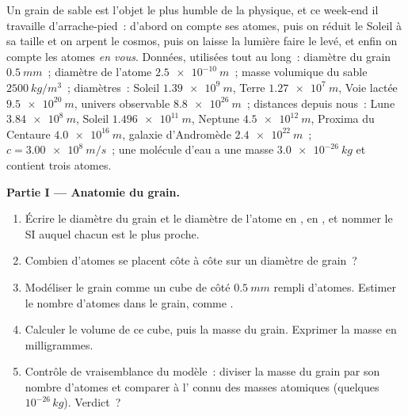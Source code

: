 \begin{problem}
\label{pb:g10:orders-of-magnitude:1}
Un grain de sable est l'objet le plus humble de la physique, et ce
week-end il travaille d'arrache-pied~: d'abord on compte ses atomes,
puis on réduit le Soleil à sa taille et on arpent le cosmos, puis on
laisse la lumière faire le levé, et enfin on compte les atomes
\emph{en vous}. Données, utilisées tout au long~: diamètre du grain
$\qty{0.5}{mm}$~; diamètre de l'atome $\qty{2.5e-10}{m}$~; masse
volumique du sable $\qty{2500}{kg/m^3}$~; diamètres~: Soleil
$\qty{1.39e9}{m}$, Terre $\qty{1.27e7}{m}$, Voie lactée
$\qty{9.5e20}{m}$, univers observable $\qty{8.8e26}{m}$~; distances
depuis nous~: Lune $\qty{3.84e8}{m}$, Soleil $\qty{1.496e11}{m}$,
Neptune $\qty{4.5e12}{m}$, Proxima du Centaure $\qty{4.0e16}{m}$,
galaxie d'Andromède $\qty{2.4e22}{m}$~; $c = \qty{3.00e8}{m/s}$~; une
molécule d'eau a une masse $\qty{3.0e-26}{kg}$ et contient trois
atomes.

\medskip
\noindent\textbf{Partie I --- Anatomie du grain.}
\begin{enumerate}
  \item Écrire le diamètre du grain et le diamètre de l'atome en
        , en , et nommer le 
        SI auquel chacun est le plus proche.
  \item Combien d'atomes se placent côte à côte sur un diamètre de
        grain~?
  \item Modéliser le grain comme un cube de côté $\qty{0.5}{mm}$
        rempli d'atomes. Estimer le nombre d'atomes dans le grain,
        comme .
  \item Calculer le volume de ce cube, puis la masse du grain.
        Exprimer la masse en milligrammes.
  \item Contrôle de vraisemblance du modèle~: diviser la masse du
        grain par son nombre d'atomes et comparer à l' connu des masses atomiques (quelques
        $10^{-26}\,\unit{kg}$). Verdict~?
\end{enumerate}


\end{problem}
